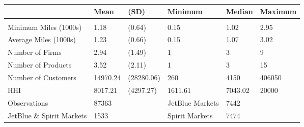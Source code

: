 
\begin{tabular}[t]{llllll}
\toprule
 & Mean & (SD) & Minimum & Median & Maximum\\
\midrule
\addlinespace[0.3em]
\multicolumn{6}{l}{\textbf{Pre-Pandemic}}\\
\hspace{1em}Minimum Miles (1000s) & 1.18 & (0.64) & 0.15 & 1.02 & 2.95\\
\hspace{1em}Average Miles (1000s) & 1.23 & (0.66) & 0.15 & 1.07 & 3.02\\
\hspace{1em}Number of Firms & 2.94 & (1.49) & 1 & 3 & 9\\
\hspace{1em}Number of Products & 3.52 & (2.11) & 1 & 3 & 15\\
\hspace{1em}Number of Customers & 14970.24 & (28280.06) & 260 & 4150 & 406050\\
\hspace{1em}HHI & 8017.21 & (4297.27) & 1611.61 & 7043.02 & 20000\\
\midrule
\hspace{1em}Observations & 87363 &  & JetBlue Markets & 7442 & \\
\hspace{1em}JetBlue \& Spirit Markets & 1533 &  & Spirit Markets & 7474 & \\
\bottomrule
\end{tabular}
